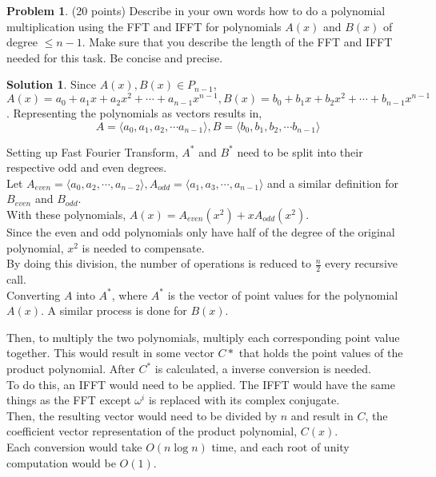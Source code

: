 \documentclass{article}
\theoremstyle{definition}
\newtheorem{problem}{Problem}
\newtheorem*{solution}{Solution}
\begin{document}
\begin{problem} (20 points) 
Describe in your own words how to do a polynomial multiplication using the FFT and
  IFFT for polynomials $A(x)$ and $B(x)$ of degree $\le n-1$. Make
  sure that you describe the length of the FFT and IFFT needed for
  this task. Be concise and precise. 
\end{problem}
\begin{solution}
Since $A(x),B(x)\in P_{n-1}$,\\
$A(x)=a_0+a_1x+a_2x^2+\cdots+a_{n-1}x^{n-1},B(x)=b_0+b_1x+b_2x^2+\cdots+b_{n-1}x^{n-1}$.
Representing the polynomials as vectors results in,
\[A=\langle a_0,a_1,a_2,\cdots a_{n-1}\rangle, B=\langle b_0,b_1,b_2,\cdots b_{n-1}\rangle\]

\noindent
Setting up Fast Fourier Transform, $A^*$ and $B^*$ need to be split into their respective odd and even degrees.\\
Let $A_{even}=\langle a_0,a_2,\cdots,a_{n-2}\rangle,A_{odd}=\langle a_1,a_3,\cdots,a_{n-1}\rangle$ and a similar definition for $B_{even}$ and $B_{odd}$.\\
With these polynomials, $A(x)=A_{even}(x^2)+xA_{odd}(x^2)$.\\
Since the even and odd polynomials only have half of the degree of the original polynomial, $x^2$ is needed to compensate.\\
By doing this division, the number of operations is reduced to $\displaystyle\frac{n}{2}$ every recursive call.\\
Converting $A$ into $A^*$, where $A^*$ is the vector of point values for the polynomial $A(x)$. A similar process is done for $B(x)$.

\noindent
Then, to multiply the two polynomials, multiply each corresponding point value together. This would result in some vector $C*$ that holds the point values of the product polynomial. After $C^*$ is calculated, a inverse conversion is needed.\\
To do this, an IFFT would need to be applied. The IFFT would have the same things as the FFT except $\omega^i$ is replaced with its complex conjugate.\\
Then, the resulting vector would need to be divided by $n$ and result in $C$, the coefficient vector representation of the product polynomial, $C(x)$.\\
Each conversion would take $O(n\log n)$ time, and each root of unity computation would be $O(1)$.
\end{solution}
\end{document}
